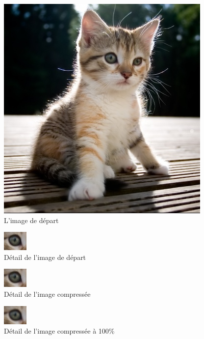 \documentclass{article}
\begin{document}
\begin{figure}[!h]
\centering
\includegraphics[scale=0.5]{images/chat.jpg}
\caption{L'image de départ}
\label{chat1}
\end{figure}

\begin{figure}[!h]
\centering
\includegraphics[scale=2]{images/chat_orig.jpg}
\caption{Détail de l'image de départ}
\label{dchat}
\end{figure}

\begin{figure}[!h]
\centering
\includegraphics[scale=2]{images/chat_compress.jpg}
\caption{Détail de l'image compressée}
\label{chat2}
\end{figure}

\begin{figure}[!h]
\centering
\includegraphics[scale=2]{images/chat_compress255.jpg}
\caption{Détail de l'image compressée à 100\%}
\label{chat3}
\end{figure}
\end{document}
